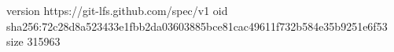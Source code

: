 version https://git-lfs.github.com/spec/v1
oid sha256:72c28d8a523433e1fbb2da03603885bce81cac49611f732b584e35b9251e6f53
size 315963
